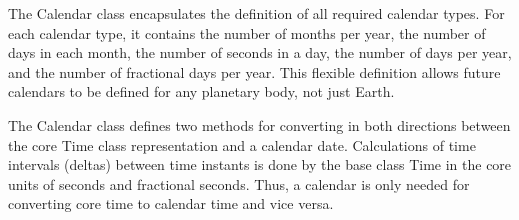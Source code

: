 
The Calendar class encapsulates the definition of all required calendar types.
For each calendar type, it contains the number of months per year, the
number of days in each month, the number of seconds in a day, the number of
days per year, and the number of fractional days per year.  This flexible
definition allows future calendars to be defined for any planetary body, not
just Earth. 

The Calendar class defines two methods for converting in both
directions between the core Time class representation and a calendar date.
Calculations of time intervals (deltas) between time instants is done by the
base class Time in the core units of seconds and fractional seconds.  Thus,
a calendar is only needed for converting core time to calendar time and vice
versa.
